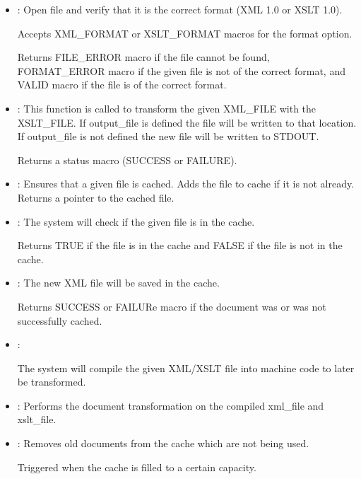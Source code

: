 \begin {itemize}
    \item{
        :
        Open file and verify that it is the correct format (XML 1.0 or XSLT 1.0).

        Accepts XML\_FORMAT or XSLT\_FORMAT macros for the format option.

        Returns FILE\_ERROR macro if the file cannot be found, FORMAT\_ERROR macro if the given file is not of the correct format, and VALID macro if the file is of the correct format.
    }
    \item{
        :
        This function is called to transform the given XML\_FILE with the XSLT\_FILE.
        If output\_file is defined the file will be written to that location.
        If output\_file is not defined the new file will be written to STDOUT.

        Returns a status macro (SUCCESS or FAILURE).
    }
    \item{
        :
        Ensures that a given file is cached.
        Adds the file to cache if it is not already.
        Returns a pointer to the cached file.
    }
    \item{
        :
        The system will check if the given file is in the cache.
        
        Returns TRUE if the file is in the cache and FALSE if the file is not in the cache.
    }
    \item{
        :
        The new XML file will be saved in the cache.
        
        Returns SUCCESS or FAILURe macro if the document was or was not successfully cached.
    }
    \item{
        :

        The system will compile the given XML/XSLT file into machine code to later be transformed.
    }
    \item{
        :
        Performs the document transformation on the compiled xml\_file and xslt\_file.
    }
    \item{
        :
        Removes old documents from the cache which are not being used.

        Triggered when the cache is filled to a certain capacity.
    }
\end{itemize}

